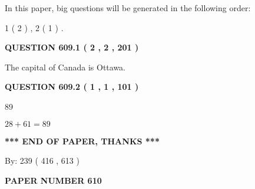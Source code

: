 \documentclass[12pt]{article}
\begin{document}
In this paper, big questions will be generated in the following order: 
   
   
   1 ( 2 )
 ,
   2 ( 1 )
 .
  
\vspace{0.2in}
  
{\textbf{\Large{QUESTION
609.1 
 ( 2 , 2 , 201 )
}}}
  
  
 
 
\noindent{}
 
 
The capital of Canada is Ottawa.
 
 
 
 
  
\vspace{0.2in}
  
{\textbf{\Large{QUESTION
609.2 
 ( 1 , 1 , 101 )
}}}
  
  
 
 
\noindent{}

89
 
 
 
 
\noindent{}

$ %
28 +  %
61=   %
89$
 
 
   
   
 \vspace{0.2in}
 
   
   
   
   
\vspace{1.0in} 
{\textbf{\large{ *** END OF PAPER, THANKS *** }}} 
   
   
\hspace{1.0in} By: 
 239 ( 416 ,  613 )
   
   
   
   
\newpage 
\setcounter{page}{ 
   610001 } 
   
   
   
   
 {\textbf{ \Large{ PAPER NUMBER  610  }}}
   
   
\vspace{0.2in}
   
   
   
   
   
\end{document}
